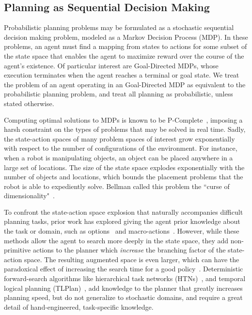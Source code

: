 \documentclass[11pt]{article}
\begin{document}
\subsection{Planning as Sequential Decision Making}
Probabilistic planning problems may be formulated as a stochastic sequential decision making problem, modeled as a Markov Decision Process (MDP). In these problems, an agent must find a mapping from states to actions for some subset of the state space that enables the agent to maximize reward over the course of the agent's existence. Of particular interest are Goal-Directed MDPs, whose execution terminates when the agent reaches a terminal or goal state. We treat the problem of an agent operating in an Goal-Directed MDP as equivalent to the probabilistic planning problem, and treat all planning as probabilistic, unless stated otherwise.

Computing optimal solutions to MDPs is known to be P-Complete~\cite{littman1995complexity}, imposing a harsh constraint on the types of problems that may be solved in real time. Sadly, the state-action spaces of many problem spaces of interest grow exponentially with respect to the number of configurations of the environment.  For instance, when a robot is manipulating objects, an object can be placed anywhere in a large set of locations.  The size of the state space explodes exponentially with the number of objects and locations, which bounds the placement problems that the robot is able to expediently solve. Bellman called this problem the ``curse of dimensionality"~\cite{bellman1961adaptive}.

To confront the state-action space explosion that naturally accompanies difficult planning tasks, prior work has explored giving the agent prior knowledge about the task or domain, such as options~\cite{sutton99} and macro-actions~\cite{Botea:2005kx,Newton:2005vn}.  However, while these methods allow the agent to search more deeply in the state space, they add non-primitive actions to the planner which {\em increase} the branching factor of the state-action space.  The resulting augmented space is even larger, which can have the paradoxical effect of increasing the search time for a good policy~\cite{Jong:2008zr}. Deterministic forward-search algorithms like hierarchical task networks (HTNs)~\cite{Nau:1999:SSH:1624312.1624357}, and temporal logical planning (TLPlan)~\cite{Bacchus95usingtemporal,Bacchus99usingtemporal}, add knowledge to the planner that greatly increases planning speed, but do not generalize to stochastic domains, and require a great detail of hand-engineered, task-specific knowledge.
\end{document}

